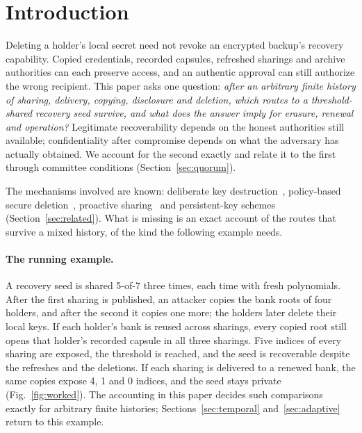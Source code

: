 \documentclass[pdflatex,sn-mathphys-num]{sn-jnl}%
\theoremstyle{plain}
\theoremstyle{definition}
\begin{document}
\section{Introduction}\label{sec:intro}

Deleting a holder's local secret need not revoke an encrypted backup's recovery capability. Copied credentials, recorded capsules, refreshed sharings and archive authorities can each preserve access, and an authentic approval can still authorize the wrong recipient. This paper asks one question: \emph{after an arbitrary finite history of sharing, delivery, copying, disclosure and deletion, which routes to a threshold-shared recovery seed survive, and what does the answer imply for erasure, renewal and operation?} Legitimate recoverability depends on the honest authorities still available; confidentiality after compromise depends on what the adversary has actually obtained. We account for the second exactly and relate it to the first through committee conditions (Section~\ref{sec:quorum}).

The mechanisms involved are known: deliberate key destruction~\cite{boneh1996,perlman2007}, policy-based secure deletion~\cite{cachin2013}, proactive sharing~\mbox{\cite{ostrovsky1991,herzberg1995,zhou2005,marsh2004}} and persistent-key schemes~\cite{dodis2024,dodisstandard2024,backendal2026} (Section~\ref{sec:related}). What is missing is an exact account of the routes that survive a mixed history, of the kind the following example needs.

\paragraph{The running example.}
A recovery seed is shared 5-of-7 three times, each time with fresh polynomials. After the first sharing is published, an attacker copies the bank roots of four holders, and after the second it copies one more; the holders later delete their local keys. If each holder's bank is reused across sharings, every copied root still opens that holder's recorded capsule in all three sharings. Five indices of every sharing are exposed, the threshold is reached, and the seed is recoverable despite the refreshes and the deletions. If each sharing is delivered to a renewed bank, the same copies expose 4, 1 and 0 indices, and the seed stays private (Fig.~\ref{fig:worked}). The accounting in this paper decides such comparisons exactly for arbitrary finite histories; Sections~\ref{sec:temporal} and~\ref{sec:adaptive} return to this example.
\end{document}
